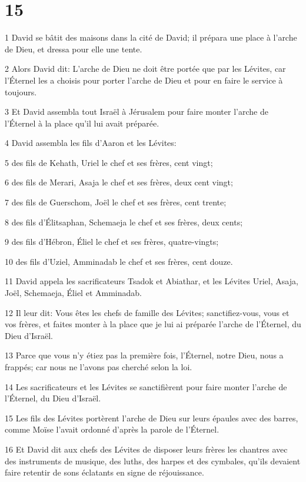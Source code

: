 \chapter{15}

\par 1 David se bâtit des maisons dans la cité de David; il prépara une place à l'arche de Dieu, et dressa pour elle une tente.
\par 2 Alors David dit: L'arche de Dieu ne doit être portée que par les Lévites, car l'Éternel les a choisis pour porter l'arche de Dieu et pour en faire le service à toujours.
\par 3 Et David assembla tout Israël à Jérusalem pour faire monter l'arche de l'Éternel à la place qu'il lui avait préparée.
\par 4 David assembla les fils d'Aaron et les Lévites:
\par 5 des fils de Kehath, Uriel le chef et ses frères, cent vingt;
\par 6 des fils de Merari, Asaja le chef et ses frères, deux cent vingt;
\par 7 des fils de Guerschom, Joël le chef et ses frères, cent trente;
\par 8 des fils d'Élitsaphan, Schemaeja le chef et ses frères, deux cents;
\par 9 des fils d'Hébron, Éliel le chef et ses frères, quatre-vingts;
\par 10 des fils d'Uziel, Amminadab le chef et ses frères, cent douze.
\par 11 David appela les sacrificateurs Tsadok et Abiathar, et les Lévites Uriel, Asaja, Joël, Schemaeja, Éliel et Amminadab.
\par 12 Il leur dit: Vous êtes les chefs de famille des Lévites; sanctifiez-vous, vous et vos frères, et faites monter à la place que je lui ai préparée l'arche de l'Éternel, du Dieu d'Israël.
\par 13 Parce que vous n'y étiez pas la première fois, l'Éternel, notre Dieu, nous a frappés; car nous ne l'avons pas cherché selon la loi.
\par 14 Les sacrificateurs et les Lévites se sanctifièrent pour faire monter l'arche de l'Éternel, du Dieu d'Israël.
\par 15 Les fils des Lévites portèrent l'arche de Dieu sur leurs épaules avec des barres, comme Moïse l'avait ordonné d'après la parole de l'Éternel.
\par 16 Et David dit aux chefs des Lévites de disposer leurs frères les chantres avec des instruments de musique, des luths, des harpes et des cymbales, qu'ils devaient faire retentir de sons éclatants en signe de réjouissance.

